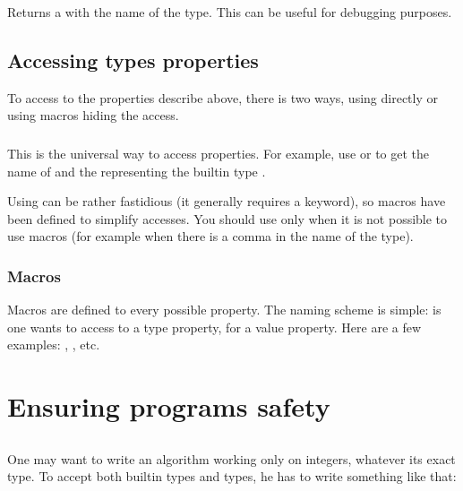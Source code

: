 Returns a  with the name of the type. This can be useful
for debugging purposes.

\subsection{Accessing types properties}

To access to the properties describe above, there is two ways, using
directly  or using macros hiding the access.

\subsubsection{}

This is the universal way to access properties. For example, use
 or
 to get the name of
 and the  representing the builtin
type .

Using  can be rather fastidious (it generally
requires a  keyword), so macros have been defined to
simplify accesses. You should use  only when it is
not possible to use macros (for example when there is a comma in the
name of the type).

\subsubsection{Macros}

Macros are defined to every possible property. The naming scheme is
simple:  is one wants to access to a
type property,  for a value property. Here are
a few examples: ,
, etc.

\section{Ensuring programs safety}

\subsection{}

One may want to write an algorithm working only on integers, whatever
its exact type. To accept both builtin types and {\integre} types, he
has to write something like that:

